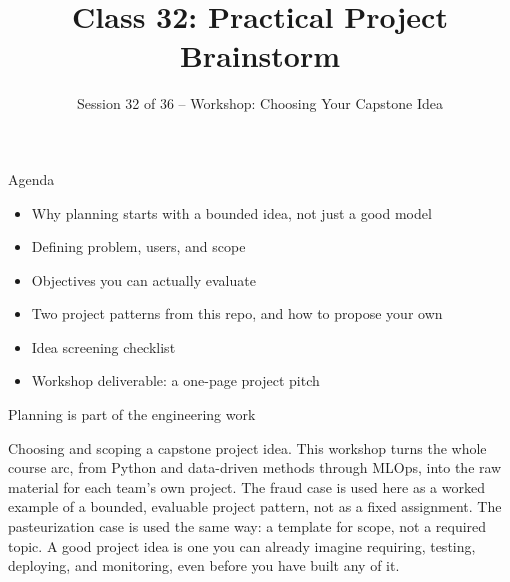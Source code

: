 

\title{Class 32: Practical Project Brainstorm}
\subtitle{Session 32 of 36 -- Workshop: Choosing Your Capstone Idea}
\author{\coursename}
\date{}



\frame{\titlepage \coursefooter}

\begin{frame}{Agenda}
\begin{itemize}
\item Why planning starts with a bounded idea, not just a good model
\item Defining problem, users, and scope
\item Objectives you can actually evaluate
\item Two project patterns from this repo, and how to propose your own
\item Idea screening checklist
\item Workshop deliverable: a one-page project pitch
\end{itemize}
\coursefooter
\end{frame}

\begin{frame}{Planning is part of the engineering work}
\coursefooter
\end{frame}

\coursecontextframe
{Choosing and scoping a capstone project idea.}
{This workshop turns the whole course arc, from Python and data-driven methods through MLOps, into the raw material for each team's own project.}
{The fraud case is used here as a worked example of a bounded, evaluable project pattern, not as a fixed assignment.}
{The pasteurization case is used the same way: a template for scope, not a required topic.}
{A good project idea is one you can already imagine requiring, testing, deploying, and monitoring, even before you have built any of it.}

